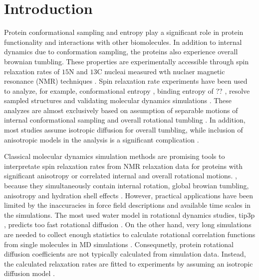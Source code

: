 \documentclass[pre,aps,floatfix,authordate1-4,twocolumn]{revtex4-1}
\begin{document}
\section{Introduction}
Protein conformational sampling and entropy
play a significant role in protein functionality
and interactions with other biomolecules.
In addition to internal dynamics due to conformation sampling, the
proteins also experience overall brownian tumbling.
These properties are experimentally accessible through 
spin relaxation rates of $15$N and $13$C nucleai measured
wth nuclaer magnetic resonance (NMR) 
techniques \cite{jarymowycz06,korzhnev01,bedem15}. 
Spin relaxation rate experiments have been used to analyze,
for example, conformational
entropy \cite{??}, binding entropy of ?? \cite{??}, resolve sampled structures \cite{??}
and validating molecular dynamics simulations \cite{??}.
These analyzes are almost exclusively based on assumption
of separable motions of internal conformational sampling 
and overall rotational tumbling \cite{??}. In addition, most studies
assume isotropic diffusion for overall tumbling, while
inclusion of anisotropic models in the analysis is a significant
complication \cite{jarymowycz06,korzhnev01,lenhningbuhl??}.


%

 
Classical molecular dynamics simulation methods are
promising tools to interpretate spin relaxation rates from NMR
relaxation data for proteins with significant anisotropy or
correlated internal and overall rotational motions.
, because they simultaneously contain internal rotation,
global browian tumbling, anisotropy and hydration shell effects \cite{??}.
However, practical applications have been limited by the inaccuracies
in force field descriptions and available time scales in the simulations.
The most used water model in rotational dynamics studies, tip3p \cite{??},
predicts too fast rotational diffusion \cite{??}. On the other hand, very long
simulations are needed to collect enough statistics to calculate rotational
correlation functions from single molecules in MD simulations \cite{??}.
Consequnetly, protein rotational diffusion coefficients are not typically
calculated from simulation data. Instead, the calculated relaxation rates
are fitted to experiments by assuming an isotropic diffusion model \cite{??}.
\end{document}
